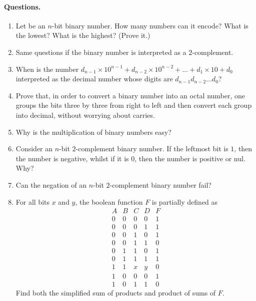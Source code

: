 \paragraph{Questions.}
\begin{enumerate}

  \item Let be an \(n\)-bit binary number. How many numbers can it
    encode? What is the lowest? What is the highest? (Prove it.)

  \item Same questions if the binary number is interpreted as a
    \(2\)-complement.

  \item When is the number \(d_{n-1} \times 10^{n-1} + d_{n-2} \times
    10^{n-2} + \dots + d_1 \times 10 + d_0\) interpreted as the
    decimal number whose digits are \(d_{n-1}d_{n-2} \dots d_0\)?

  \item Prove that, in order to convert a binary number into an octal
    number, one groups the bits three by three from right to left and
    then convert each group into decimal, without worrying about
    carries.

  \item Why is the multiplication of binary numbers easy?

  \item Consider an \(n\)-bit \(2\)-complement binary number. If the
    leftmost bit is \(1\), then the number is negative, whilst if it
    is \(0\), then the number is positive or nul. Why?

  \item Can the negation of an \(n\)-bit \(2\)-complement binary
    number fail?

  \item For all bits \(x\) and \(y\), the boolean function \(F\) is
    partially defined as
\[
\begin{array}{c|c|c|c||c}
  A & B & C & D & F\\
\hline
  0 & 0 & 0 & 0 & 1\\
  0 & 0 & 0 & 1 & 1\\
  0 & 0 & 1 & 0 & 1\\
  0 & 0 & 1 & 1 & 0\\
  0 & 1 & 1 & 0 & 1\\
  0 & 1 & 1 & 1 & 1\\
  1 & 1 & x & y & 0\\
  1 & 0 & 0 & 0 & 1\\
  1 & 0 & 1 & 1 & 0
\end{array}
\]
Find both the simplified sum of products and product of sums of \(F\).

\end{enumerate}
